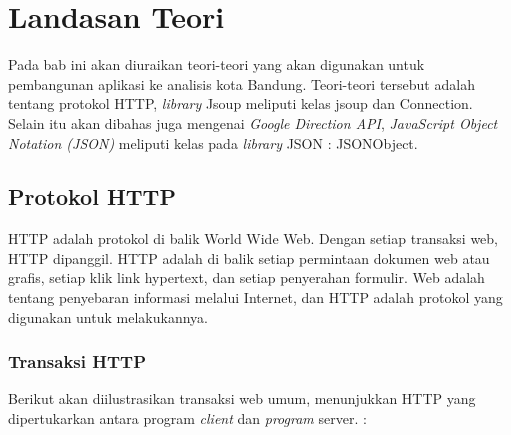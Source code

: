 \chapter{Landasan Teori}
\label{chap:teori}

Pada bab ini akan diuraikan teori-teori yang akan digunakan untuk pembangunan aplikasi ke analisis kota Bandung. Teori-teori tersebut adalah tentang protokol HTTP, \textit{library} Jsoup meliputi kelas jsoup dan Connection. Selain itu akan dibahas juga mengenai \textit{Google Direction API}, \textit{JavaScript Object Notation (JSON)} meliputi kelas pada \textit{library} JSON : JSONObject.

\section{Protokol HTTP}
\label{sec:protocolhttp} 

HTTP adalah protokol di balik World Wide Web. Dengan setiap transaksi web, HTTP dipanggil. HTTP adalah di balik setiap permintaan dokumen web atau grafis, setiap klik link hypertext, dan setiap penyerahan formulir. Web adalah tentang penyebaran informasi melalui Internet, dan HTTP adalah protokol yang digunakan untuk melakukannya.

\subsection{Transaksi HTTP}
\label{subsec:architecturehttp}

Berikut akan diilustrasikan transaksi web umum, menunjukkan HTTP yang dipertukarkan antara program \textit{client} dan \textit{program} server. \cite{wong2000http}:

